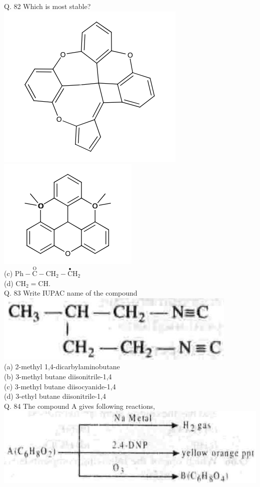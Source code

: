\documentclass[10pt]{article}
\begin{document}
Q. 82 Which is most stable?\\
\includegraphics{smile-10e9c8b5ffad5f4fdeb0b49b792ba2758f47c4bd}\\
\includegraphics{smile-2610671a3b8881482e379d32b37afc7bef952da3}\\
(c) $\mathrm{Ph}-\stackrel{\mathrm{O}}{\mathrm{C}}-\mathrm{CH}_{2}-\stackrel{\bullet}{\mathrm{C}} \mathrm{H}_{2}$\\
(d) $\mathrm{CH}_{2}=\mathrm{CH}$.\\
Q. 83 Write IUPAC name of the compound\\
\includegraphics[max width=\textwidth, center]{2025_01_28_8470952b98110cec3aabg-138(1)}\\
(a) 2-methyl 1,4-dicarbylaminobutane\\
(b) 3-methyl butane diisonitrile-1,4\\
(c) 3-methyl butane diisocyanide-1,4\\
(d) 3-ethyl butane diisonitrile-1,4\\
Q. 84 The compound A gives following reactions,\\
\includegraphics[max width=\textwidth, center]{2025_01_28_8470952b98110cec3aabg-138(3)}
\end{document}
